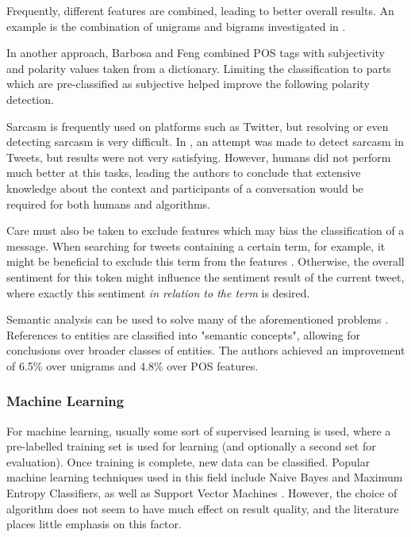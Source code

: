 \documentclass{sig-alternate}
\begin{document}
Frequently, different features are combined, leading to better overall results. An example is the combination of unigrams and bigrams investigated in \cite{go2009twitter}.

In another approach, Barbosa and Feng \cite{barbosa2010robust} combined POS tags with subjectivity and polarity values taken from a dictionary. Limiting the classification to parts which are pre-classified as subjective helped improve the following polarity detection.

\medskip

Sarcasm is frequently used on platforms such as Twitter, but resolving or even detecting sarcasm is very difficult. In \cite{gonzalez2011identifying}, an attempt was made to detect sarcasm in Tweets, but results were not very satisfying. However, humans did not perform much better at this tasks, leading the authors to conclude that extensive knowledge about the context  and participants of a conversation would be required for both humans and algorithms.

Care must also be taken to exclude features which may bias the classification of a message. When searching for tweets containing a certain term, for example, it might be beneficial to exclude this term from the features \cite{go2009twitter}. Otherwise, the overall sentiment for this token might influence the sentiment result of the current tweet, where exactly this sentiment \textit{in relation to the term} is desired.

Semantic analysis can be used to solve many of the aforementioned problems \cite{saif2012semantic}. References to entities are classified into "semantic concepts", allowing for conclusions over broader classes of entities. The authors achieved an improvement of 6.5\% over unigrams and 4.8\% over POS features.

\subsubsection{Machine Learning}

For machine learning, usually some sort of supervised learning is used, where a pre-labelled training set is used for learning (and optionally a second set for evaluation). Once training is complete, new data can be classified. Popular machine learning techniques used in this field include Naive Bayes and Maximum Entropy Classifiers, as well as Support Vector Machines \cite{vinodhini2012sentiment}. However, the choice of algorithm does not seem to have much effect on result quality, and the literature places little emphasis on this factor.
\end{document}
